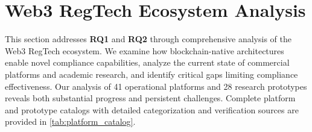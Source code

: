 \section{Web3 RegTech Ecosystem Analysis}
\label{sec:ecosystem}

This section addresses \textbf{RQ1} and \textbf{RQ2} through comprehensive analysis of the Web3 RegTech ecosystem. We examine how blockchain-native architectures enable novel compliance capabilities, analyze the current state of commercial platforms and academic research, and identify critical gaps limiting compliance effectiveness. Our analysis of 41 operational platforms and 28 research prototypes reveals both substantial progress and persistent challenges. Complete platform and prototype catalogs with detailed categorization and verification sources are provided in \autoref{tab:platform_catalog}.


